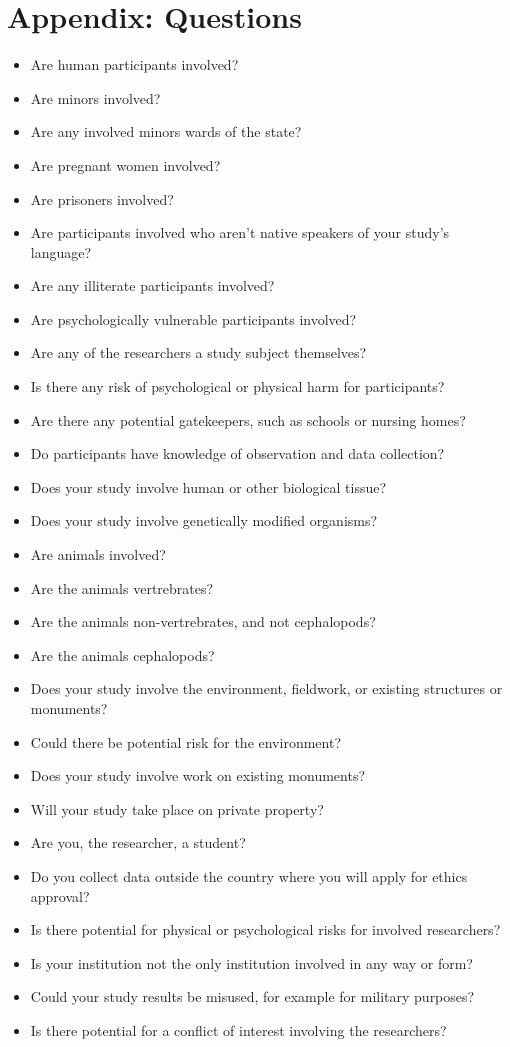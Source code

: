 \documentclass[10pt]{article}
\begin{document}
\section{Appendix: Questions}
\begin{itemize}
\item Are human participants involved?
\item Are minors involved?
\item Are any involved minors wards of the state?
\item Are pregnant women involved?
\item Are prisoners involved?
\item Are participants involved who aren't native speakers of your study's language?
\item Are any illiterate participants involved?
\item Are psychologically vulnerable participants involved?
\item Are any of the researchers a study subject themselves?
\item Is there any risk of psychological or physical harm for participants?
\item Are there any potential gatekeepers, such as schools or nursing homes?
\item Do participants have knowledge of observation and data collection?
\item Does your study involve human or other biological tissue?
\item Does your study involve genetically modified organisms?
\item Are animals involved?
\item Are the animals vertrebrates?
\item Are the animals non-vertrebrates, and not cephalopods?
\item Are the animals cephalopods?
\item Does your study involve the environment, fieldwork, or existing structures or monuments?
\item Could there be potential risk for the environment?
\item Does your study involve work on existing monuments?
\item Will your study take place on private property?
\item Are you, the researcher, a student?
\item Do you collect data outside the country where you will apply for ethics approval?
\item Is there potential for physical or psychological risks for involved researchers?
\item Is your institution not the only institution involved in any way or form?
\item Could your study results be misused, for example for military purposes?
\item Is there potential for a conflict of interest involving the researchers?
\end{itemize}
\end{document}

